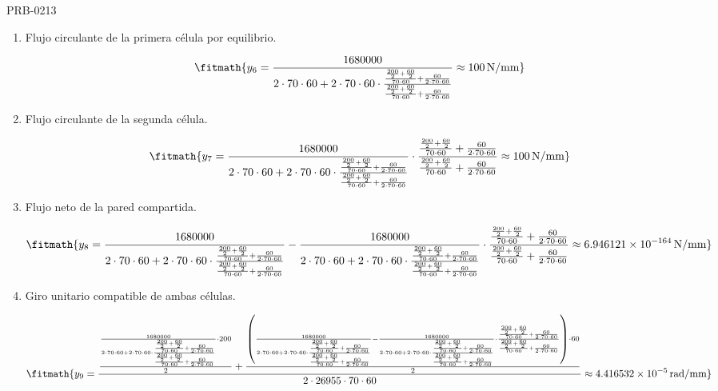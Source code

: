 \begin{studiumworked}{PRB-0213}
\begin{enumerate}
\[\fitmath{y_{5}=\frac{\frac{\frac{200}{2}+\frac{60}{2}}{70\cdot 60}+\frac{60}{2\cdot 70\cdot 60}}{\frac{\frac{200}{2}+\frac{60}{2}}{70\cdot 60}+\frac{60}{2\cdot 70\cdot 60}}\approx 1\,}\]

\item Flujo circulante de la primera célula por equilibrio.

\[\fitmath{y_{6}=\frac{1680000}{2\cdot 70\cdot 60+2\cdot 70\cdot 60\cdot \frac{\frac{\frac{200}{2}+\frac{60}{2}}{70\cdot 60}+\frac{60}{2\cdot 70\cdot 60}}{\frac{\frac{200}{2}+\frac{60}{2}}{70\cdot 60}+\frac{60}{2\cdot 70\cdot 60}}}\approx 100\,\mathrm{N/mm}}\]

\item Flujo circulante de la segunda célula.

\[\fitmath{y_{7}=\frac{1680000}{2\cdot 70\cdot 60+2\cdot 70\cdot 60\cdot \frac{\frac{\frac{200}{2}+\frac{60}{2}}{70\cdot 60}+\frac{60}{2\cdot 70\cdot 60}}{\frac{\frac{200}{2}+\frac{60}{2}}{70\cdot 60}+\frac{60}{2\cdot 70\cdot 60}}}\cdot \frac{\frac{\frac{200}{2}+\frac{60}{2}}{70\cdot 60}+\frac{60}{2\cdot 70\cdot 60}}{\frac{\frac{200}{2}+\frac{60}{2}}{70\cdot 60}+\frac{60}{2\cdot 70\cdot 60}}\approx 100\,\mathrm{N/mm}}\]

\item Flujo neto de la pared compartida.

\[\fitmath{y_{8}=\frac{1680000}{2\cdot 70\cdot 60+2\cdot 70\cdot 60\cdot \frac{\frac{\frac{200}{2}+\frac{60}{2}}{70\cdot 60}+\frac{60}{2\cdot 70\cdot 60}}{\frac{\frac{200}{2}+\frac{60}{2}}{70\cdot 60}+\frac{60}{2\cdot 70\cdot 60}}}-\frac{1680000}{2\cdot 70\cdot 60+2\cdot 70\cdot 60\cdot \frac{\frac{\frac{200}{2}+\frac{60}{2}}{70\cdot 60}+\frac{60}{2\cdot 70\cdot 60}}{\frac{\frac{200}{2}+\frac{60}{2}}{70\cdot 60}+\frac{60}{2\cdot 70\cdot 60}}}\cdot \frac{\frac{\frac{200}{2}+\frac{60}{2}}{70\cdot 60}+\frac{60}{2\cdot 70\cdot 60}}{\frac{\frac{200}{2}+\frac{60}{2}}{70\cdot 60}+\frac{60}{2\cdot 70\cdot 60}}\approx 6.946121\times10^{-164}\,\mathrm{N/mm}}\]

\item Giro unitario compatible de ambas células.

\[\fitmath{y_{9}=\frac{\frac{\frac{1680000}{2\cdot 70\cdot 60+2\cdot 70\cdot 60\cdot \frac{\frac{\frac{200}{2}+\frac{60}{2}}{70\cdot 60}+\frac{60}{2\cdot 70\cdot 60}}{\frac{\frac{200}{2}+\frac{60}{2}}{70\cdot 60}+\frac{60}{2\cdot 70\cdot 60}}}\cdot 200}{2}+\frac{\left(\frac{1680000}{2\cdot 70\cdot 60+2\cdot 70\cdot 60\cdot \frac{\frac{\frac{200}{2}+\frac{60}{2}}{70\cdot 60}+\frac{60}{2\cdot 70\cdot 60}}{\frac{\frac{200}{2}+\frac{60}{2}}{70\cdot 60}+\frac{60}{2\cdot 70\cdot 60}}}-\frac{1680000}{2\cdot 70\cdot 60+2\cdot 70\cdot 60\cdot \frac{\frac{\frac{200}{2}+\frac{60}{2}}{70\cdot 60}+\frac{60}{2\cdot 70\cdot 60}}{\frac{\frac{200}{2}+\frac{60}{2}}{70\cdot 60}+\frac{60}{2\cdot 70\cdot 60}}}\cdot \frac{\frac{\frac{200}{2}+\frac{60}{2}}{70\cdot 60}+\frac{60}{2\cdot 70\cdot 60}}{\frac{\frac{200}{2}+\frac{60}{2}}{70\cdot 60}+\frac{60}{2\cdot 70\cdot 60}}\right)\cdot 60}{2}}{2\cdot 26955\cdot 70\cdot 60}\approx 4.416532\times10^{-5}\,\mathrm{rad/mm}}\]


\end{enumerate}
\end{studiumworked}
